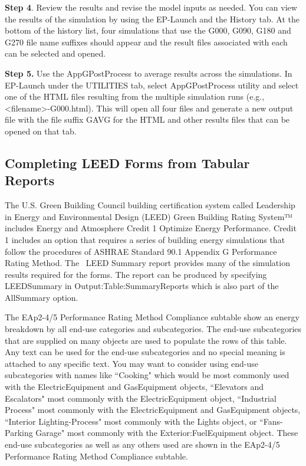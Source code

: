 \textbf{Step 4}. Review the results and revise the model inputs as needed. You can view the results of the simulation by using the EP-Launch and the History tab. At the bottom of the history list, four simulations that use the G000, G090, G180 and G270 file name suffixes should appear and the result files associated with each can be selected and opened.

\textbf{Step 5.} Use the AppGPostProcess to average results across the simulations. In EP-Launch under the UTILITIES tab, select AppGPostProcess utility and select one of the HTML files resulting from the multiple simulation runs (e.g., \textless{}filename\textgreater{}-G000.html). This will open all four files and generate a new output file with the file suffix GAVG for the HTML and other results files that can be opened on that tab.

\subsection{Completing LEED Forms from Tabular Reports}\label{completing-leed-forms-from-tabular-reports}

The U.S. Green Building Council building certification system called Leadership in Energy and Environmental Design (LEED) Green Building Rating System™ includes Energy and Atmosphere Credit 1 Optimize Energy Performance. Credit 1 includes an option that requires a series of building energy simulations that follow the procedures of ASHRAE Standard 90.1 Appendix G Performance Rating Method. The~ LEED Summary report provides many of the simulation results required for the forms. The report can be produced by specifying LEEDSummary in Output:Table:SummaryReports which is also part of the AllSummary option. 

The EAp2-4/5 Performance Rating Method Compliance subtable show an energy breakdown by all end-use categories and subcategories. The end-use subcategories that are supplied on many objects are used to populate the rows of this table. Any text can be used for the end-use subcategories and no special meaning is attached to any specific text. You may want to consider using end-use subcategories with names like ``Cooking" which would be most commonly used with the ElectricEquipment and GasEquipment objects, ``Elevators and Escalators" most commonly with the ElectricEquipment object, ``Industrial Process" most commonly with the ElectricEquipment and GasEquipment objects, ``Interior Lighting-Process" most commonly with the Lights object, or ``Fans-Parking Garage" most commonly with the Exterior:FuelEquipment object. These end-use subcategories as well as any others used are shown in the EAp2-4/5 Performance Rating Method Compliance subtable.

